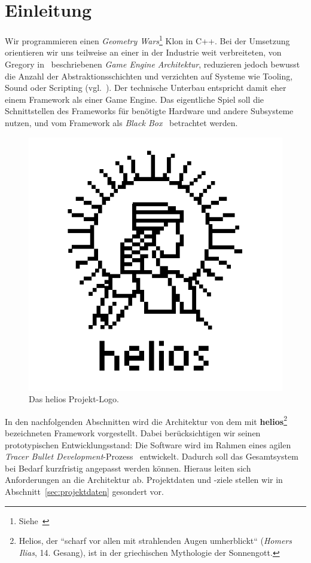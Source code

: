\section{Einleitung}

Wir programmieren einen \textit{Geometry Wars}\footnote{Siehe~\cite[]{WikipediaGeometryWars}} Klon in C++.
Bei der Umsetzung orientieren wir uns teilweise an einer in der Industrie weit verbreiteten, von Gregory in~\cite[]{Gre19} beschriebenen \textit{Game Engine Architektur}, reduzieren jedoch bewusst die Anzahl der Abstraktionsschichten und verzichten auf Systeme wie Tooling, Sound oder Scripting (vgl.~\cite[\textbf{Figure 1.16}, 39]{Gre19}).
Der technische Unterbau entspricht damit eher einem Framework als einer Game Engine.
Das eigentliche Spiel soll die Schnittstellen des Frameworks für benötigte Hardware und andere Subsysteme nutzen, und vom Framework als \textit{Black Box}~\cite[]{RB88} betrachtet werden.

\begin{figure}[tbp]
    \centering
    \includegraphics[width=0.5\columnwidth]{img/helios_logo}
    \caption{Das helios Projekt-Logo.}
    \label{fig:helios_logo}
\end{figure}

In den nachfolgenden Abschnitten wird die Architektur von dem mit \textbf{helios}\footnote{
    Helios, der ``scharf vor allen mit strahlenden Augen umherblickt`` (\textit{Homers Ilias}, 14. Gesang), ist in der griechischen Mythologie der Sonnengott.
} bezeichneten Framework vorgestellt.
Dabei berücksichtigen wir seinen prototypischen Entwicklungsstand:
Die Software wird im Rahmen eines agilen \textit{Tracer Bullet Development}-Prozess~\cite[50 f.]{TH20} entwickelt.
Dadurch soll das Gesamtsystem bei Bedarf kurzfristig angepasst werden können.
Hieraus leiten sich Anforderungen an die Architektur ab.
Projektdaten und -ziele stellen wir in Abschnitt~\ref{sec:projektdaten} gesondert vor.\par

